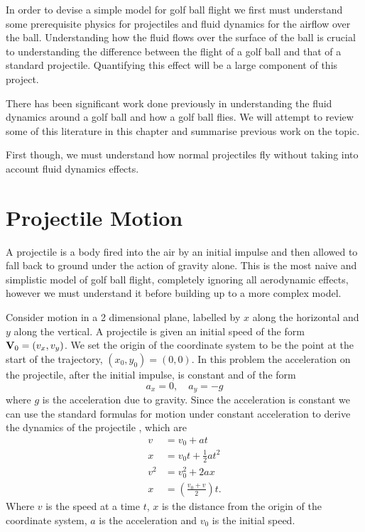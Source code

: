 In order to devise a simple model for golf ball flight we first must understand some
prerequisite physics for projectiles and fluid dynamics for the airflow over the ball. Understanding
how the fluid flows over the surface of the ball is crucial to understanding the difference between
the flight of a golf ball and that of a standard projectile. Quantifying this effect will be a large
component of this project.

There has been significant work done previously in understanding the fluid dynamics around a golf ball
and how a golf ball flies. We will attempt to review some of this literature in this chapter and summarise
previous work on the topic.

First though, we must understand how normal projectiles fly without taking into account fluid dynamics effects.
\section{Projectile Motion}
A projectile is a body fired into the air by an initial impulse and then allowed to fall back to ground under the
action of gravity alone. This is the most naive and simplistic model of golf ball flight, completely
ignoring all aerodynamic effects, however we must understand it before building up to a more
complex model.

Consider motion in a 2 dimensional plane, labelled by $x$ along the horizontal and $y$ along the vertical.
A projectile is given an initial speed of the form $\mathbf{V}_0 = (v_x, v_y)$. We set the origin of the coordinate system to be the point at the start of the
trajectory, $(x_0, y_0) = (0,0)$. In this problem the acceleration on the projectile, after the initial
impulse, is constant and of the form
\begin{equation} \label{grav}
a_x = 0, \quad a_y = -g
\end{equation}
where $g$ is the acceleration due to gravity. Since the acceleration is constant we can use
the standard formulas for motion under constant acceleration to derive the dynamics of the
projectile \citet{yandf}, which are
\begin{subequations} \label{suvat}
\begin{align}
v &= v_0 + at \label{v} \\
x &= v_0 t + \frac{1}{2} a t^2 \label{xsuvat} \\
v^2 &= v_0^2 + 2ax \\
x &= \left(\frac{v_0 + v}{2}\right) t .
\end{align}
\end{subequations}
Where $v$ is the speed at a time $t$, $x$ is the distance from the origin of the coordinate system,
$a$ is the acceleration and $v_0$ is the initial speed.

